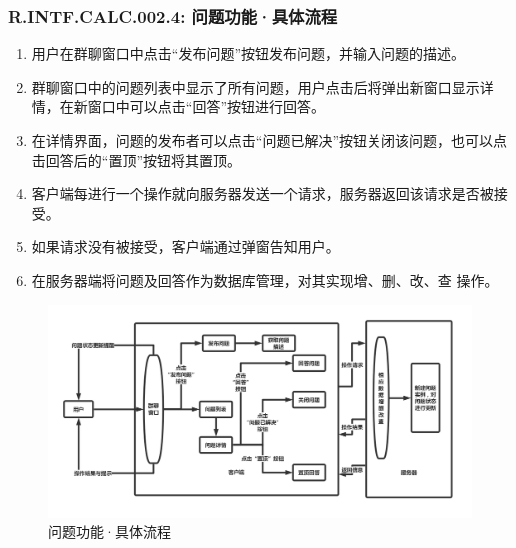         {
        \color{red}
        \subsubsection{\color{red}R.INTF.CALC.002.4: 问题功能·具体流程}
            \begin{enumerate}
                \item 用户在群聊窗口中点击“发布问题”按钮发布问题，并输入问题的描述。
                \item 群聊窗口中的问题列表中显示了所有问题，用户点击后将弹出新窗口显示详情，在新窗口中可以点击“回答”按钮进行回答。
                \item 在详情界面，问题的发布者可以点击“问题已解决”按钮关闭该问题，也可以点击回答后的“置顶”按钮将其置顶。
                \item 客户端每进行一个操作就向服务器发送一个请求，服务器返回该请求是否被接受。
                \item 如果请求没有被接受，客户端通过弹窗告知用户。
                \item 在服务器端将问题及回答作为数据库管理，对其实现增、删、改、查 操作。
            \end{enumerate}
        }
        \begin{figure}[h]
            \centering
            \includegraphics[scale=0.35]{OutlineDesign/figures/问题功能·具体流程.png}
            \caption{\color{red}问题功能·具体流程}
            \label{fig:server_flow}
        \end{figure}
